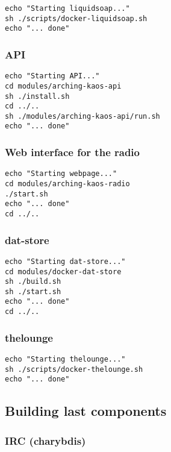 \documentclass[12pt]{report}
\begin{document}
\begin{verbatim}
echo "Starting liquidsoap..."
sh ./scripts/docker-liquidsoap.sh
echo "... done"
\end{verbatim}


\subsubsection{API}\label{api-1}

\begin{verbatim}
echo "Starting API..."
cd modules/arching-kaos-api
sh ./install.sh
cd ../..
sh ./modules/arching-kaos-api/run.sh
echo "... done"
\end{verbatim}


\subsubsection{Web interface for the
radio}\label{web-interface-for-the-radio}

\begin{verbatim}
echo "Starting webpage..."
cd modules/arching-kaos-radio
./start.sh
echo "... done"
cd ../..
\end{verbatim}


\subsubsection{dat-store}\label{dat-store}

\begin{verbatim}
echo "Starting dat-store..."
cd modules/docker-dat-store
sh ./build.sh
sh ./start.sh
echo "... done"
cd ../..
\end{verbatim}


\subsubsection{thelounge}\label{thelounge}

\begin{verbatim}
echo "Starting thelounge..."
sh ./scripts/docker-thelounge.sh
echo "... done"
\end{verbatim}


\subsection{Building last
components}\label{building-last-components}


\subsubsection{IRC (charybdis)}\label{irc-charybdis}
\end{document}
